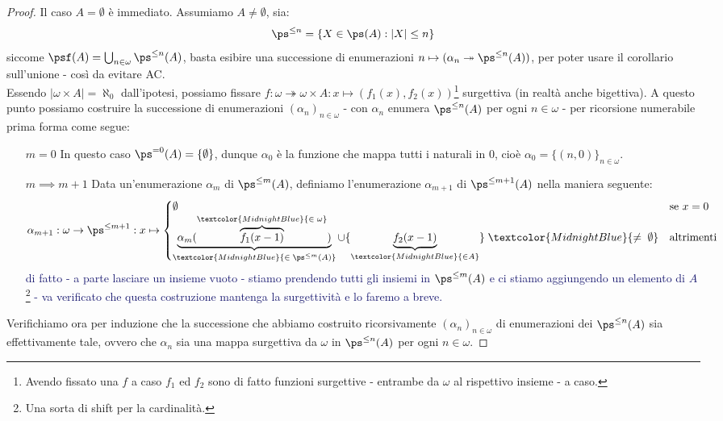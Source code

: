 \begin{proof}
	Il caso $A = \emptyset$ è immediato. Assumiamo $A \ne \emptyset$, sia:
	\[ \ps^{\leq n} = \{X \in \ps(A) : |X| \leq n\}
		\]
	siccome $\psf(A) = \bigcup_{n \in \omega} \ps^{\leq n}(A)$, basta esibire una successione di enumerazioni $n \mapsto (\alpha_n \twoheadrightarrow \ps^{\leq n}(A))$, per poter usare il corollario sull'unione - così da evitare AC.\\
	Essendo $|\omega \times A| = \aleph_0$ dall'ipotesi, possiamo fissare  $f : \omega \twoheadrightarrow \omega \times A : x \mapsto (f_1(x),f_2(x))$\footnote{Avendo fissato una $f$ a caso $f_1$ ed $f_2$ sono di fatto funzioni surgettive - entrambe da $\omega$ al rispettivo insieme - a caso.}
	surgettiva (in realtà anche bigettiva). A questo punto possiamo costruire la successione di enumerazioni $(\alpha_n)_{n \in \omega}$ - 
	con $\alpha_n$ enumera $\ps^{\leq n}(A)$ per ogni $n \in \omega$ - per ricorsione numerabile prima forma come segue:
	\begin{itemize}
		\item[$\boxed{m = 0}$] In questo caso $\ps^{=0}(A) = \{\emptyset\}$, dunque $\alpha_0$ è la funzione che mappa tutti i naturali in 0, cioè $\alpha_0 = \{(n,0)\}_{n \in \omega}$.
		\item[$\boxed{m \implies m + 1}$] Data un'enumerazione $\alpha_m$ di $\ps^{\leq m}(A)$, definiamo l'enumerazione $\alpha_{m + 1}$ di $\ps^{\leq m + 1}(A)$ nella maniera seguente:
		\[ 	\alpha_{m + 1} : \omega \rightarrow \ps^{\leq m + 1} : x \mapsto \begin{cases}
			\emptyset &\text{se $x = 0$} \\
			\underbrace{\alpha_m(\overbrace{f_1(x-1)}^{\textcolor{MidnightBlue}{\in \; \omega}})}_{\textcolor{MidnightBlue}{\in \;\ps^{\leq m}(A)}} \cup \{\underbrace{f_2(x - 1)}_{\textcolor{MidnightBlue}{\in A}}\}\;\textcolor{MidnightBlue}{\ne \;\emptyset} &\text{altrimenti}
			\end{cases}
		\]
		\textcolor{MidnightBlue}{di fatto - a parte lasciare un insieme vuoto - stiamo prendendo tutti gli insiemi in $\ps^{\leq m}(A)$ e ci stiamo aggiungendo un elemento di $A$\footnote{Una sorta di shift per la cardinalità.} - va verificato che questa costruzione mantenga la surgettività e lo faremo a breve.}
	\end{itemize}
	Verifichiamo ora per induzione che la successione che abbiamo costruito ricorsivamente $(\alpha_n)_{n \in \omega}$ di enumerazioni dei $\ps^{\leq n}(A)$ sia effettivamente tale, ovvero che $\alpha_n$ sia una mappa surgettiva da $\omega$ in $\ps^{\leq n}(A)$ per ogni $n \in \omega$.

\end{proof}
